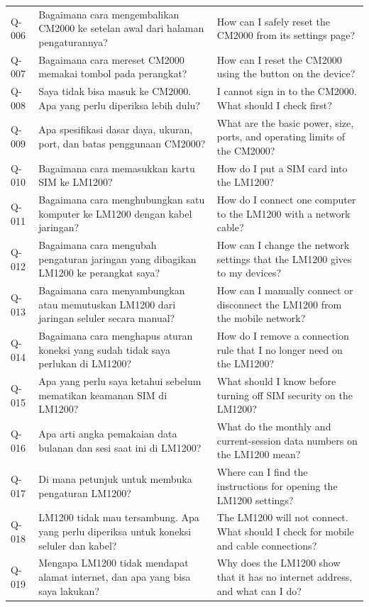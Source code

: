 \begin{longtable}{@{}>{\RaggedRight\arraybackslash}p{1.6cm}>{\RaggedRight\arraybackslash}p{5.8cm}>{\RaggedRight\arraybackslash}p{\dimexpr\textwidth-1.6cm-5.8cm-4\tabcolsep\relax}@{}}
Q-006 & Bagaimana cara mengembalikan CM2000 ke setelan awal dari halaman pengaturannya? & How can I safely reset the CM2000 from its settings page? \\
Q-007 & Bagaimana cara mereset CM2000 memakai tombol pada perangkat? & How can I reset the CM2000 using the button on the device? \\
Q-008 & Saya tidak bisa masuk ke CM2000. Apa yang perlu diperiksa lebih dulu? & I cannot sign in to the CM2000. What should I check first? \\
Q-009 & Apa spesifikasi dasar daya, ukuran, port, dan batas penggunaan CM2000? & What are the basic power, size, ports, and operating limits of the CM2000? \\
Q-010 & Bagaimana cara memasukkan kartu SIM ke LM1200? & How do I put a SIM card into the LM1200? \\
Q-011 & Bagaimana cara menghubungkan satu komputer ke LM1200 dengan kabel jaringan? & How do I connect one computer to the LM1200 with a network cable? \\
Q-012 & Bagaimana cara mengubah pengaturan jaringan yang dibagikan LM1200 ke perangkat saya? & How can I change the network settings that the LM1200 gives to my devices? \\
Q-013 & Bagaimana cara menyambungkan atau memutuskan LM1200 dari jaringan seluler secara manual? & How can I manually connect or disconnect the LM1200 from the mobile network? \\
Q-014 & Bagaimana cara menghapus aturan koneksi yang sudah tidak saya perlukan di LM1200? & How do I remove a connection rule that I no longer need on the LM1200? \\
Q-015 & Apa yang perlu saya ketahui sebelum mematikan keamanan SIM di LM1200? & What should I know before turning off SIM security on the LM1200? \\
Q-016 & Apa arti angka pemakaian data bulanan dan sesi saat ini di LM1200? & What do the monthly and current-session data numbers on the LM1200 mean? \\
Q-017 & Di mana petunjuk untuk membuka pengaturan LM1200? & Where can I find the instructions for opening the LM1200 settings? \\
Q-018 & LM1200 tidak mau tersambung. Apa yang perlu diperiksa untuk koneksi seluler dan kabel? & The LM1200 will not connect. What should I check for mobile and cable connections? \\
Q-019 & Mengapa LM1200 tidak mendapat alamat internet, dan apa yang bisa saya lakukan? & Why does the LM1200 show that it has no internet address, and what can I do? \\

\end{longtable}
